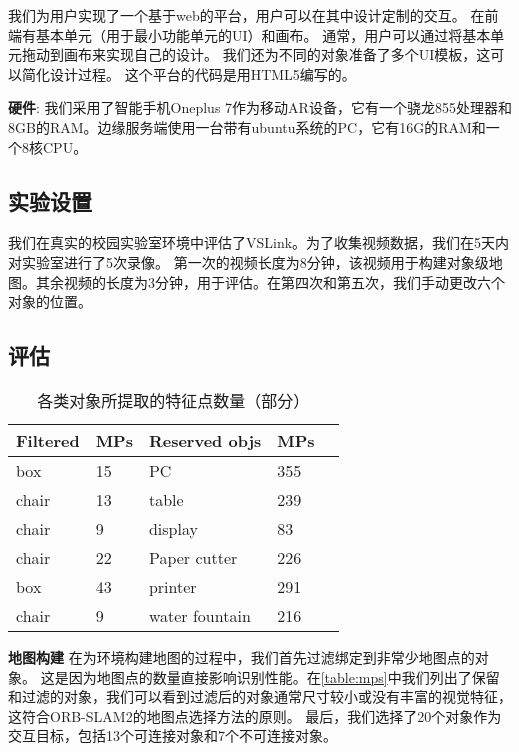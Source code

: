 我们为用户实现了一个基于web的平台，用户可以在其中设计定制的交互。
在前端有基本单元（用于最小功能单元的UI）和画布。
通常，用户可以通过将基本单元拖动到画布来实现自己的设计。
我们还为不同的对象准备了多个UI模板，这可以简化设计过程。
这个平台的代码是用HTML5编写的。

\textbf{硬件}: 我们采用了智能手机Oneplus 7作为移动AR设备，它有一个骁龙855处理器和8GB的RAM。边缘服务端使用一台带有ubuntu系统的PC，它有16G的RAM和一个8核CPU。
\subsection{实验设置}

我们在真实的校园实验室环境中评估了VSLink。为了收集视频数据，我们在5天内对实验室进行了5次录像。
第一次的视频长度为8分钟，该视频用于构建对象级地图。其余视频的长度为3分钟，用于评估。在第四次和第五次，我们手动更改六个对象的位置。

\subsection{评估}

\begin{table}  
	\small  
	\caption{各类对象所提取的特征点数量（部分）}  
	\begin{center}  
		\begin{tabular}{|l|l|l|l| p{4cm}|}  
			\hline  
			\textbf{Filtered} & \textbf{MPs} & \textbf{Reserved objs} & \textbf{MPs}\\ \hline  
			box & 15 & PC & 355  \\ \hline 
			chair & 13 & table & 239  \\ \hline 
			chair & 9 & display & 83  \\ \hline  
			chair & 22 & Paper cutter & 226  \\ \hline  
			box & 43 & printer & 291  \\ \hline  
			chair & 9 & water fountain & 216  \\ \hline  
		\end{tabular}  
	\end{center}  
\end{table}\label{table:mps}  

\textbf{地图构建} 
在为环境构建地图的过程中，我们首先过滤绑定到非常少地图点的对象。
这是因为地图点的数量直接影响识别性能。在\autoref{table:mps}中我们列出了保留和过滤的对象，我们可以看到过滤后的对象通常尺寸较小或没有丰富的视觉特征，这符合ORB-SLAM2\cite{mur2017orb}的地图点选择方法的原则。
最后，我们选择了20个对象作为交互目标，包括13个可连接对象和7个不可连接对象。

